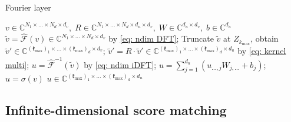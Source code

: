 \documentclass{article}
\begin{document}
\begin{algorithm}
    \renewcommand{\algorithmicrequire}{\textbf{Input:}}
    \renewcommand{\algorithmicensure}{\textbf{Output:}}
    \caption{Fourier layer}
    \label{alg: fourier layer}
    \begin{algorithmic}
        \REQUIRE $v\in\mathbb{C}^{N_1\times\dots\times N_d\times d_v},\; R\in\mathbb{C}^{N_1\times\dots\times N_d\times d_u\times d_v},\; W\in\mathbb{C}^{d_u\times d_v},\;b\in\mathbb{C}^{d_u}$
        \STATE $\tilde{v} = \hat{\mathcal{F}}(v) \in \mathbb{C}^{N_1\times\dots\times N_d\times d_v}$ by \ref{eq: ndim DFT};
        \STATE Truncate $\tilde{v}$ at $Z_{k_{\max}}$, obtain $\tilde{v}'\in \mathbb{C}^{(\mathfrak{k}_{\max})_1\times\dots\times (\mathfrak{k}_{\max})_d\times d_v}$;
        \STATE $\tilde{v}' = R\cdot\tilde{v}' \in \mathbb{C}^{(\mathfrak{k}_{\max})_1\times\dots\times (\mathfrak{k}_{\max})_d\times d_u}$ by \ref{eq: kernel multi};
        \STATE $u = \hat{\mathcal{F}}^{-1}(\tilde{v})$ by \ref{eq: ndim iDFT};
        \STATE $u = \sum_{j=1}^{d_u}(u_{\dots,j}W_{j,\dots} + b_{j})$;
        \STATE $u = \sigma(v)$
        \ENSURE $u\in \mathbb{C}^{(\mathfrak{k}_{\max})_1\times\dots\times (\mathfrak{k}_{\max})_d\times d_u}$
    \end{algorithmic}
\end{algorithm}

\subsection{Infinite-dimensional score matching}
\end{document}
